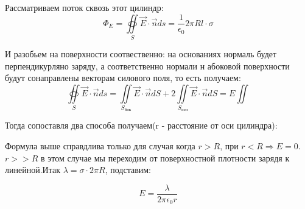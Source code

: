 \documentclass[../main.tex]{subfiles}
\begin{document}
\begin{center}
\end{center}

Рассматриваем поток сквозь этот цилиндр:
\[\Phi_E = \oiint\limits_S \vec E \cdot \vec n ds = \frac{1}{\epsilon_0} 2 \pi R l \cdot \sigma \]

И разобьем на поверхности соотвественно: на основаниях нормаль будет перпендикурляно заряду, а соответственно нормали н абоковой поверхности будут сонаправлены векторам силового поля, то есть получаем:
\[\oiint\limits_S \vec E \cdot \vec n ds = \iint\limits_{S_{бок}} \vec E \cdot \vec n dS + 2\iint\limits_{S_{осн}} \vec E \cdot \vec n dS = E \iint\]

Тогда сопоставля два способа получаем(r - расстояние от оси цилиндра):

Формула выше справдлива только для случая когда $r > R$, при $r < R \Rightarrow E = 0$. $r >> R$ в этом случае мы переходим от поверхностной плотности зарядя к линейной.Итак $\lambda = \sigma \cdot 2\pi R$, подставим:

\[ E = \frac{\lambda}{2\pi \epsilon_0 r}\]
\end{document}
